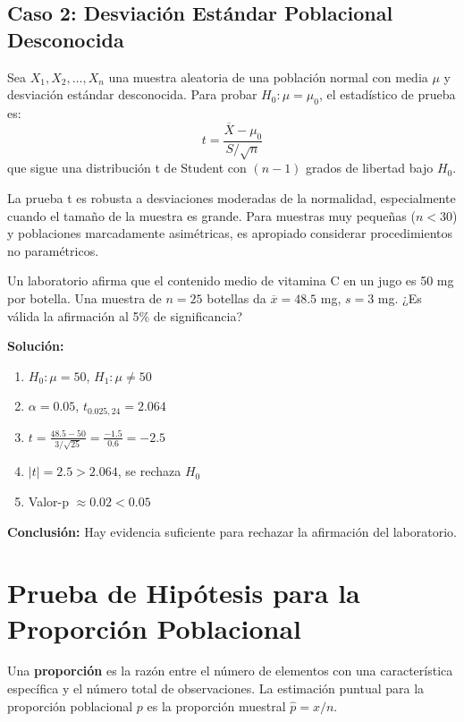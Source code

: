 \subsection{Caso 2: Desviación Estándar Poblacional Desconocida}

\begin{theorem}
Sea $X_1, X_2, \ldots, X_n$ una muestra aleatoria de una población normal con media $\mu$ y desviación estándar desconocida. Para probar $H_0: \mu = \mu_0$, el estadístico de prueba es:
\[
t = \frac{\overline{X} - \mu_0}{S/\sqrt{n}}
\]
que sigue una distribución t de Student con $(n-1)$ grados de libertad bajo $H_0$.
\end{theorem}

\begin{remark}
La prueba t es robusta a desviaciones moderadas de la normalidad, especialmente cuando el tamaño de la muestra es grande. Para muestras muy pequeñas ($n < 30$) y poblaciones marcadamente asimétricas, es apropiado considerar procedimientos no paramétricos.
\end{remark}

\begin{example}
Un laboratorio afirma que el contenido medio de vitamina C en un jugo es 50 mg por botella. Una muestra de $n=25$ botellas da $\overline{x} = 48.5$ mg, $s = 3$ mg. ¿Es válida la afirmación al 5\% de significancia?

\textbf{Solución:}
\begin{enumerate}
    \item $H_0: \mu = 50$, $H_1: \mu \neq 50$
    \item $\alpha = 0.05$, $t_{0.025,24} = 2.064$
    \item $t = \frac{48.5 - 50}{3/\sqrt{25}} = \frac{-1.5}{0.6} = -2.5$
    \item $|t| = 2.5 > 2.064$, se rechaza $H_0$
    \item Valor-p $\approx 0.02 < 0.05$
\end{enumerate}
\textbf{Conclusión:} Hay evidencia suficiente para rechazar la afirmación del laboratorio.
\end{example}

\section{Prueba de Hipótesis para la Proporción Poblacional}

\begin{definition}
Una \textbf{proporción} es la razón entre el número de elementos con una característica específica y el número total de observaciones. La estimación puntual para la proporción poblacional $p$ es la proporción muestral $\hat{p} = x/n$.
\end{definition}

